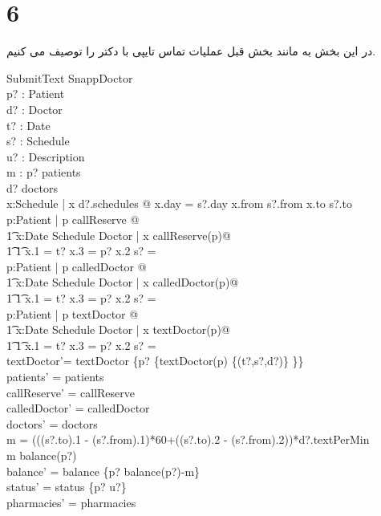 \documentclass{article}
\begin{document}
\section*{6}
در این بخش به مانند بخش قبل عملیات تماس تایپی با دکتر را توصیف می کنیم.
\begin{schema}{SubmitText}
\Delta SnappDoctor\\
p? : Patient\\
d? : Doctor\\
t? : Date\\
s? : Schedule\\
u? : Description\\
m : \nat
\where
p? \in patients\\
d? \in doctors\\
\exists x:Schedule | x \in d?.schedules @ x.day = s?.day \land x.from \le s?.from \land x.to \ge s?.to\\
\forall p:Patient | p \in callReserve @ \\
\t1 \forall x:Date \cross Schedule \cross Doctor | x \in callReserve(p)@\\
\t1 \t1 x.1 = t? \land x.3 = p? \implies x.2 \cap s? = \emptyset\\

\forall p:Patient | p \in calledDoctor @ \\
\t1 \forall x:Date \cross Schedule \cross Doctor | x \in calledDoctor(p)@\\
\t1 \t1 x.1 = t? \land x.3 = p? \implies x.2 \cap s? = \emptyset\\

\forall p:Patient | p \in textDoctor @ \\
\t1 \forall x:Date \cross Schedule \cross Doctor | x \in textDoctor(p)@\\
\t1 \t1 x.1 = t? \land x.3 = p? \implies x.2 \cap s? = \emptyset\\

textDoctor'= textDoctor \oplus \{p? \mapsto \{textDoctor(p) \cup \{(t?,s?,d?)\} \}\}\\

patients' = patients\\ 
callReserve' = callReserve\\
calledDoctor' = calledDoctor\\
doctors' = doctors\\
m = (((s?.to).1 - (s?.from).1)*60+((s?.to).2 - (s?.from).2))*d?.textPerMin \\
m \le balance(p?)\\
balance' = balance \oplus \{p? \mapsto balance(p?)-m\} \\
status' = status \oplus \{p? \mapsto u?\}\\
pharmacies' = pharmacies
\end{schema}
\end{document}
